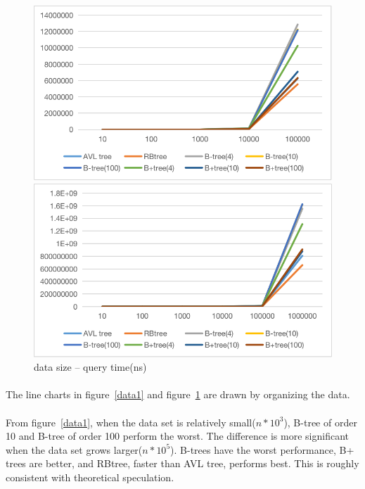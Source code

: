 \documentclass{article}
\begin{document}
\begin{figure}[htbp]
    \begin{minipage}{0.49\linewidth}
		\centering
		\includegraphics[width = \textwidth]{result5.png}
	\end{minipage}
    \begin{minipage}{0.49\linewidth}
		\centering
		\includegraphics[width = \textwidth]{result6.png}
	\end{minipage}

    \caption{data size -- query time(ns)}
    \label{data2}

\end{figure}

\paragraph{}
The line charts in figure~\ref{data1} and figure~\ref{data2} are drawn by organizing the data.

\paragraph{}
From figure~\ref{data1}, when the data set is relatively small($n * 10^3$), B-tree of order 10 and B-tree of order 100 perform the worst. The difference is more significant when the data set grows larger($n * 10^5$). B-trees have the worst performance, B+ trees are better, and RBtree, faster than AVL tree, performs best. This is roughly consistent with theoretical speculation.
\end{document}
